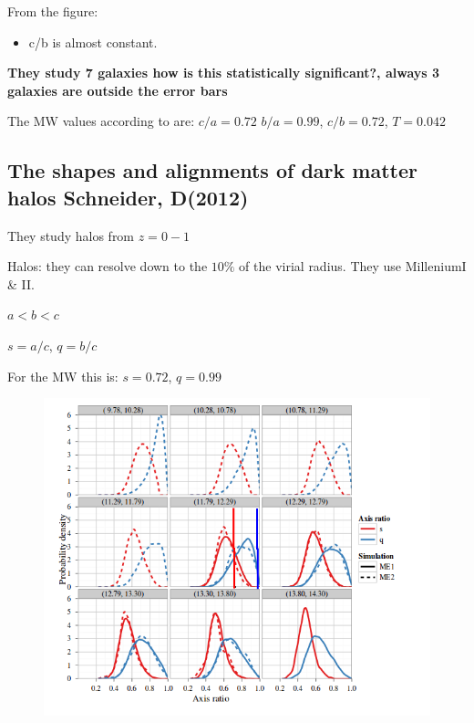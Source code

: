 \documentclass[16pt]{article}
\begin{document}
From the figure:

\begin{itemize}
\item c/b is almost constant. 
\end{itemize}

\textbf{They study 7 galaxies how is this statistically significant?, always 3 galaxies are outside the error bars }

The MW values according to \citep{Law10} are: $c/a = 0.72$ $b/a = 0.99$, $c/b = 0.72$, $T=0.042$

\subsection{The shapes and alignments of dark matter halos Schneider, D(2012)}

They study halos from $z=0-1$

Halos: they can resolve down to the $10\%$ of the virial radius. They use MilleniumI \& II.

$a<b<c$

$s=a/c$, $q=b/c$
  
For the MW this is: $s = 0.72 $, $q = 0.99 $


\begin{figure}[H]
\centering
\includegraphics[scale=0.5]{distribution.png}
\end{figure}
\end{document}
